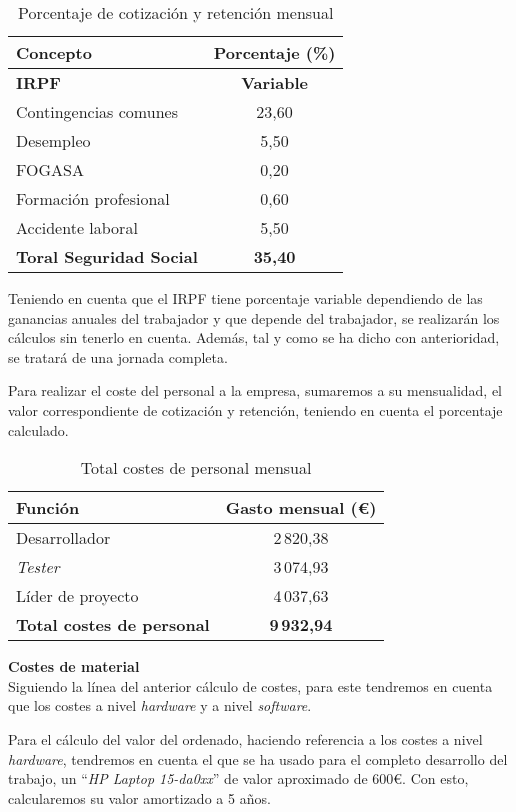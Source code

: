 \begin{table}[H]
\centering
\begin{tabular}{lc}
\toprule
Concepto & Porcentaje (\%)  \\
\midrule
\textbf{IRPF} & \textbf{Variable} \\
\midrule
Contingencias comunes & 23,60\\
Desempleo & 5,50 \\
FOGASA & 0,20\\
Formación profesional & 0,60 \\
Accidente laboral & 5,50\\
\midrule
\textbf{Toral Seguridad Social}  & \textbf{35,40} \\
\bottomrule
\end{tabular}
\caption{Porcentaje de cotización y retención mensual}
\end{table}

Teniendo en cuenta que el IRPF tiene porcentaje variable dependiendo de las ganancias anuales del trabajador y que depende del trabajador, se realizarán los cálculos sin tenerlo en cuenta. Además, tal y como se ha dicho con anterioridad, se tratará de una jornada completa. 

Para realizar el coste del personal a la empresa, sumaremos a su mensualidad, el valor correspondiente de cotización y retención, teniendo en cuenta el porcentaje calculado.

\begin{table}[H]
\centering
\begin{tabular}{lc}
\toprule
Función & Gasto mensual (€)  \\
\midrule
Desarrollador & 2\,820,38 \\
\textit{Tester} & 3\,074,93 \\
Líder de proyecto & 4\,037,63 \\
\midrule
\textbf{Total costes de personal}  & \textbf{9\,932,94} \\
\bottomrule
\end{tabular}
\caption{Total costes de personal mensual}
\end{table}


\textbf{Costes de material} \\
Siguiendo la línea del anterior cálculo de costes, para este tendremos en cuenta que los costes a nivel \textit{hardware} y a nivel \textit{software}.

Para el cálculo del valor del ordenado, haciendo referencia a los costes a nivel \textit{hardware}, tendremos en cuenta el que se ha usado para el completo desarrollo del trabajo, un ``\textit{HP Laptop 15-da0xx}'' de valor aproximado de 600€. Con esto, calcularemos su valor amortizado a 5 años.

